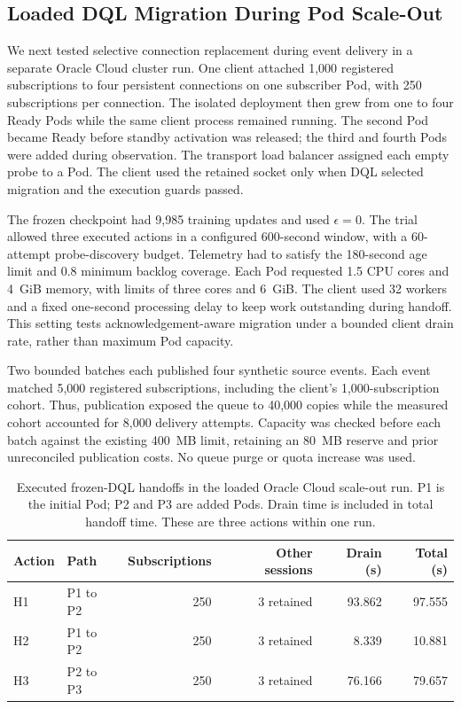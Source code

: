 \subsection{Loaded DQL Migration During Pod Scale-Out}
\label{sec:live-dql-scaleout}

We next tested selective connection replacement during event delivery in a
separate Oracle Cloud cluster run. One client attached 1,000 registered
subscriptions to four persistent connections on one subscriber Pod, with
250 subscriptions per connection. The isolated deployment then grew from
one to four Ready Pods while the same client process remained running.
The second Pod became Ready before standby activation was released; the
third and fourth Pods were added during observation. The transport load
balancer assigned each empty probe to a Pod. The client used the retained
socket only when DQL selected migration and the execution guards passed.

The frozen checkpoint had 9,985 training updates and used $\epsilon=0$.
The trial allowed three executed actions in a configured 600-second window,
with a 60-attempt probe-discovery budget. Telemetry had to satisfy the
180-second age limit and 0.8 minimum backlog coverage. Each Pod requested
1.5 CPU cores and 4~GiB memory, with limits of three cores and 6~GiB.
The client used 32 workers and a fixed one-second processing delay to keep
work outstanding during handoff. This setting tests acknowledgement-aware
migration under a bounded client drain rate, rather than maximum Pod capacity.

Two bounded batches each published four synthetic source events. Each event
matched 5,000 registered subscriptions, including the client's 1,000-subscription
cohort. Thus, publication exposed the queue to 40,000 copies while the measured
cohort accounted for 8,000 delivery attempts. Capacity was checked before each
batch against the existing 400~MB limit, retaining an 80~MB reserve and prior
unreconciled publication costs. No queue purge or quota increase was used.

\begin{table}[!htbp]
  \centering
  \small
  \caption{Executed frozen-DQL handoffs in the loaded Oracle Cloud scale-out
  run. P1 is the initial Pod; P2 and P3 are added Pods. Drain time is included
  in total handoff time. These are three actions within one run.}
  \label{tab:live-dql-loaded-handoffs}
  \begin{tabular}{llrrrr}
    \toprule
    Action & Path & Subscriptions & Other sessions & Drain (s) & Total (s) \\
    \midrule
    H1 & P1 to P2 & 250 & 3 retained & 93.862 & 97.555 \\
    H2 & P1 to P2 & 250 & 3 retained & 8.339 & 10.881 \\
    H3 & P2 to P3 & 250 & 3 retained & 76.166 & 79.657 \\
    \bottomrule
  \end{tabular}
\end{table}

